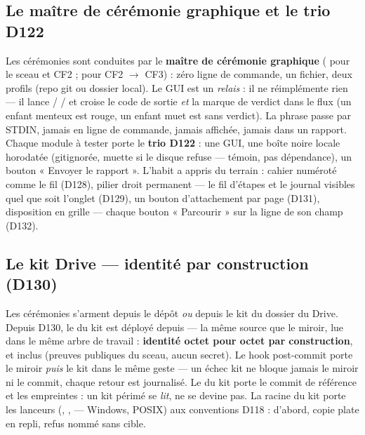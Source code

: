 \subsection{Le maître de cérémonie graphique et le trio D122}\label{sec:gui}

Les cérémonies sont conduites par le \textbf{maître de cérémonie graphique}
( pour le sceau et CF2 ; 
pour CF2 $\to$ CF3) : zéro ligne de commande, un fichier, deux profils (repo git ou
dossier local). Le GUI est un \emph{relais} : il ne réimplémente rien — il lance
 /  /  et croise le code de
sortie \emph{et} la marque de verdict dans le flux (un enfant menteux est rouge, un
enfant muet est sans verdict). La phrase passe par STDIN, jamais en ligne de commande,
jamais affichée, jamais dans un rapport. Chaque module à tester porte le \textbf{trio
D122} : une GUI, une boîte noire locale horodatée (gitignorée, muette si le disque
refuse — témoin, pas dépendance), un bouton « Envoyer le rapport ». L'habit a appris du
terrain : cahier numéroté comme le fil (D128), pilier droit permanent — le fil d'étapes
et le journal visibles quel que soit l'onglet (D129), un bouton d'attachement par page
(D131), disposition en grille — chaque bouton « Parcourir » sur la ligne de son champ
(D132).

\subsection{Le kit Drive — identité par construction (D130)}\label{sec:kit}

Les cérémonies s’arment depuis le dépôt \emph{ou} depuis le kit du dossier
 du Drive. Depuis D130, le  du kit est déployé depuis
 — la même source que le miroir, lue dans le même arbre de
travail : \textbf{identité octet pour octet par construction},  et
 inclus (preuves publiques du sceau, aucun secret). Le hook post-commit
porte le miroir \emph{puis} le kit dans le même geste — un échec kit ne bloque jamais le
miroir ni le commit, chaque retour est journalisé. Le  du kit porte
le commit de référence et les empreintes : un kit périmé se \emph{lit}, ne se devine
pas. La racine du kit porte les lanceurs (,
,  —  Windows,
 POSIX) aux conventions D118 :  d'abord, copie plate en repli,
refus nommé sans cible.

